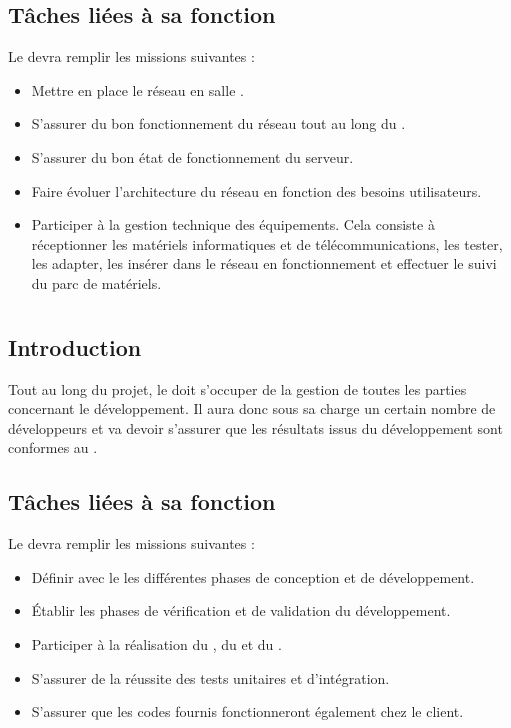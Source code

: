 \subsection*{Tâches liées à sa fonction}

Le \RRS{} devra remplir les missions suivantes :
\begin{itemize}
	\item Mettre en place le réseau en salle \PICCourt.
	\item S'assurer du bon fonctionnement du réseau tout au long du \PICCourt.
	\item S'assurer du bon état de fonctionnement du serveur.
	\item Faire évoluer l'architecture du réseau en fonction des besoins utilisateurs.
	\item Participer à la gestion technique des équipements. Cela consiste à réceptionner les matériels informatiques et de télécommunications, les tester, les adapter, les insérer dans le réseau en fonctionnement et effectuer le suivi du parc de matériels.
\end{itemize}

\newpage
\section{\RD}
\subsection*{Introduction}

Tout au long du projet, le \RD{} doit s'occuper de la gestion de toutes les parties concernant le développement. Il aura donc sous sa charge un certain nombre de développeurs et va devoir s'assurer que les résultats issus du développement sont conformes au \DGQDEUXCourt.

\subsection*{Tâches liées à sa fonction}

Le \RD{} devra remplir les missions suivantes :
\begin{itemize}
	\item Définir avec le \CP{} les différentes phases de conception et de développement.
	\item Établir les phases de vérification et de validation du développement.
	\item Participer à la réalisation du \DSECourt, du \DSICourt{} et du \PTVCourt.
	\item S'assurer de la réussite des tests unitaires et d'intégration.
	\item S'assurer que les codes fournis fonctionneront également chez le client.
\end{itemize}